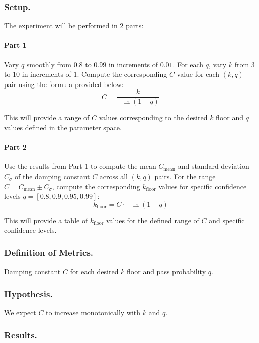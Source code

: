     \subsubsection{Setup.}
    The experiment will be performed in 2 parts:

    \paragraph{Part 1}
    Vary $q$ smoothly from $0.8$ to $0.99$ in increments of $0.01$. For each $q$, vary $k$ from $3$ to $10$ in increments of $1$. 
    Compute the corresponding $C$ value for each $(k, q)$ pair using the formula provided below:
    \[ C = \frac{k}{-\ln(1 - q)} \]

    This will provide a range of $C$ values corresponding to the desired $k$ floor and $q$ values defined in the parameter space.
    
    \paragraph{Part 2}
    Use the results from Part 1 to compute the mean $C_{\text{mean}}$ and standard deviation $C_{\sigma}$ of the damping constant $C$ across all $(k, q)$ pairs.
    For the range $C = C_{\text{mean}} \pm C_{\sigma}$, compute the corresponding $k_{\text{floor}}$ values for specific confidence levels $q = [0.8, 0.9, 0.95, 0.99]$:
    \[ k_{\text{floor}} = {C \cdot -\ln(1 - q)} \]

    This will provide a table of $k_{\text{floor}}$ values for the defined range of $C$ and specific confidence levels.

    \subsubsection{Definition of Metrics.}

        Damping constant $C$ for each desired $k$ floor and pass probability $q$.

    \subsubsection{Hypothesis.}

    We expect $C$ to increase monotonically with $k$ and $q$.

    \subsubsection{Results.}

